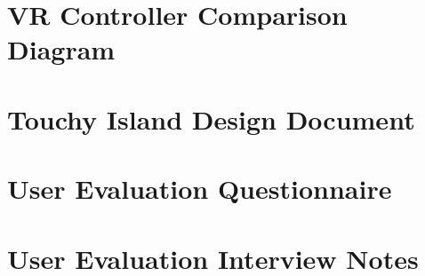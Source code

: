\documentclass[12pt, a4paper]{report}
\begin{document}
\begin{appendices}



\begingroup%
\makeatletter%
\cleardoublepage%
\let\newpage\relax%
\let\clearpage\relax%
\vspace*{\fill}%
\vspace*{\dimexpr-50\p@-\baselineskip}%
\chapter{VR Controller Comparison\\ Diagram}
\label{apx:vrControllerComparison}
\vspace*{\fill}%
\endgroup%
\newpage


\begingroup%
\makeatletter%
\cleardoublepage%
\let\newpage\relax%
\let\clearpage\relax%
\vspace*{\fill}%
\vspace*{\dimexpr-50\p@-\baselineskip}%
\chapter{Touchy Island Design Document}
\label{apx:touchyIslandDesignDocument}
\vspace*{\fill}%
\endgroup%


\begingroup%
\makeatletter%
\cleardoublepage%
\let\newpage\relax%
\let\clearpage\relax%
\vspace*{\fill}%
\vspace*{\dimexpr-50\p@-\baselineskip}%
\chapter{User Evaluation Questionnaire}
\label{apx:questionnaire}
\vspace*{\fill}%
\endgroup%


\begingroup%
\makeatletter%
\cleardoublepage%
\let\newpage\relax%
\let\clearpage\relax%
\vspace*{\fill}%
\vspace*{\dimexpr-50\p@-\baselineskip}%
\chapter{User Evaluation Interview Notes}
\label{apx:interviewNotes}
\vspace*{\fill}%
\endgroup%


\end{appendices}
\end{document}
